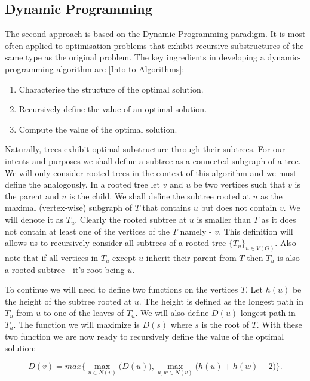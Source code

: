 \subsection{Dynamic Programming}

The second approach is based on the Dynamic Programming paradigm. It is most often applied to optimisation problems that exhibit recursive substructures of the same type as the original problem. The key ingredients in developing a dynamic-programming algorithm are [Into to Algorithms]:


\begin{enumerate}
    \item Characterise the structure of the optimal solution.
    \item Recursively define the value of an optimal solution.
    \item Compute the value of the optimal solution.
\end{enumerate}


Naturally, trees exhibit optimal substructure through their subtrees. For our intents and purposes we shall define a subtree as a connected subgraph of a tree. We will only consider rooted trees in the context of this algorithm and we must define the analogously. In a rooted tree let $v$ and $u$ be two vertices such that $v$ is the parent and $u$ is the child. We shall define the subtree rooted at $u$ as the maximal (vertex-wise) subgraph of $T$ that contains $u$ but does not contain $v$. We will denote it as $T_u$. Clearly the rooted subtree at $u$ is smaller than $T$ as it does not contain at least one of the vertices of the $T$ namely - $v$. This definition will allows us to recursively consider all subtrees of a rooted tree $\{T_u\}_{u \in V(G)}$. Also note that if all vertices in $T_u$ except $u$ inherit their parent from $T$ then $T_u$ is also a rooted subtree - it's root being $u$.

To continue we will need to define two functions on the vertices $T$. Let $h(u)$ be the height of the subtree rooted at $u$. The height is defined as the longest path in $T_u$ from $u$ to one of the leaves of $T_u$. We will also define $D(u)$ longest path in $T_u$. The function we will maximize is $D(s)$ where $s$ is the root of $T$. With these two function we are now ready to recursively define the value of the optimal solution:

$$ D(v) = max\bigg\{ \max\limits_{u \in N(v)}\bigg(D(u)\bigg), \max\limits_{u, w \in N(v)}\bigg(h(u) + h(w) + 2\bigg) \bigg\}. $$

